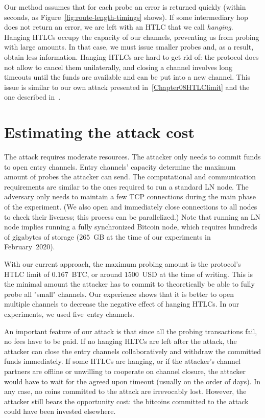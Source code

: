 Our method assumes that for each probe an error is returned quickly (within seconds, as Figure~\ref{fig:route-length-timings} shows).
If some intermediary hop does not return an error, we are left with an HTLC that we call \textit{hanging}.
Hanging HTLCs occupy the capacity of our channels, preventing us from probing with large amounts.
In that case, we must issue smaller probes and, as a result, obtain less information.
Hanging HTLCs are hard to get rid of: the protocol does not allow to cancel them unilaterally, and closing a channel involves long timeouts until the funds are available and can be put into a new channel.
This issue is similar to our own attack presented in~\ref{Chapter08HTLClimit} and the one described in~\cite{Mizrahi2020}.



\section{Estimating the attack cost}

The attack requires moderate resources.
The attacker only needs to commit funds to open entry channels.
Entry channels' capacity determine the maximum amount of probes the attacker can send.
The computational and communication requirements are similar to the ones required to run a standard LN node.
The adversary only needs to maintain a few TCP connections during the main phase of the experiment.
(We also open and immediately close connections to all nodes to check their liveness; this process can be parallelized.)
Note that running an LN node implies running a fully synchronized Bitcoin node, which requires hundreds of gigabytes of storage ($265$~GB at the time of our experiments in February~2020).

With our current approach, the maximum probing amount is the protocol's HTLC limit of $0.167$~BTC, or around $1500$~USD at the time of writing.
This is the minimal amount the attacker has to commit to theoretically be able to fully probe all "small" channels.
Our experience shows that it is better to open multiple channels to decrease the negative effect of hanging HTLCs.
In our experiments, we used five~entry channels.

An important feature of our attack is that since all the probing transactions fail, no fees have to be paid.
If no hanging HLTCs are left after the attack, the attacker can close the entry channels collaboratively and withdraw the committed funds immediately.
If some HTLCs are hanging, or if the attacker's channel partners are offline or unwilling to cooperate on channel closure, the attacker would have to wait for the agreed upon timeout (usually on the order of days).
In any case, no coins committed to the attack are irrevocably lost.
However, the attacker still bears the opportunity cost: the bitcoins committed to the attack could have been invested elsewhere.


